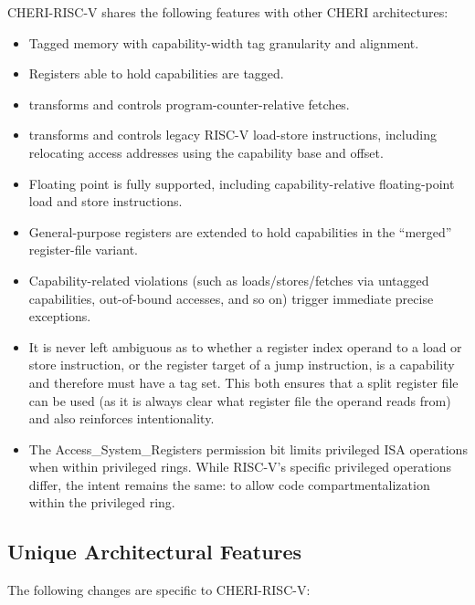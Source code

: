 CHERI-RISC-V shares the following features with other CHERI architectures:

\begin{itemize}
\item Tagged memory with capability-width tag granularity and alignment.
\item Registers able to hold capabilities are tagged.
\item \PCC{} transforms and controls program-counter-relative fetches.
\item \DDC{} transforms and controls legacy RISC-V load-store instructions,
  including relocating access addresses using the capability base and offset.
\item Floating point is fully supported, including capability-relative
  floating-point load and store instructions.
\item General-purpose registers are extended to hold capabilities in
  the ``merged'' register-file variant.
\item Capability-related violations (such as loads/stores/fetches via untagged
  capabilities, out-of-bound accesses, and so on) trigger immediate precise
  exceptions.
\item It is never left ambiguous as to whether a register index operand to a
  load or store instruction, or the register target of a jump instruction,
  is a capability and therefore must have a tag set.
  This both ensures that a split register file can be used (as it is always
  clear what register file the operand reads from) and also reinforces
  intentionality.
\item The Access\_System\_Registers permission bit limits privileged ISA
  operations when within privileged rings.
  While RISC-V's specific privileged operations differ, the intent remains the
  same: to allow code compartmentalization within the privileged ring.
\end{itemize}

\subsection{Unique Architectural Features}

The following changes are specific to CHERI-RISC-V:

